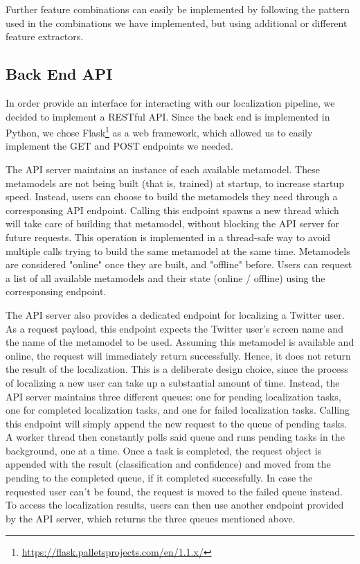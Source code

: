 \documentclass[10pt,a4paper]{article}
\begin{document}
Further feature combinations can easily be implemented by following the pattern used in the combinations we have implemented, but using additional or different feature extractors.

\subsection{Back End API}
In order provide an interface for interacting with our localization pipeline, we decided to implement a RESTful API. Since the back end is implemented in Python, we chose Flask\footnote{\href{https://flask.palletsprojects.com/en/1.1.x/}{https://flask.palletsprojects.com/en/1.1.x/}} as a web framework, which allowed us to easily implement the GET and POST endpoints we needed.

The API server maintains an instance of each available metamodel. These metamodels are not being built (that is, trained) at startup, to increase startup speed. Instead, users can choose to build the metamodels they need through a corresponsing API endpoint. Calling this endpoint spawns a new thread which will take care of building that metamodel, without blocking the API server for future requests. This operation is implemented in a thread-safe way to avoid multiple calls trying to build the same metamodel at the same time. Metamodels are considered "online" once they are built, and "offline" before. Users can request a list of all available metamodels and their state (online / offline) using the corresponsing endpoint.

The API server also provides a dedicated endpoint for localizing a Twitter user. As a request payload, this endpoint expects the Twitter user's screen name and the name of the metamodel to be used. Assuming this metamodel is available and online, the request will immediately return successfully. Hence, it does not return the result of the localization. This is a deliberate design choice, since the process of localizing a new user can take up a substantial amount of time. Instead, the API server maintains three different queues: one for pending localization tasks, one for completed localization tasks, and one for failed localization tasks. Calling this endpoint will simply append the new request to the queue of pending tasks. A worker thread then constantly polls said queue and runs pending tasks in the background, one at a time. Once a task is completed, the request object is appended with the result (classification and confidence) and moved from the pending to the completed queue, if it completed successfully. In case the requested user can't be found, the request is moved to the failed queue instead. To access the localization results, users can then use another endpoint provided by the API server, which returns the three queues mentioned above.
\end{document}
